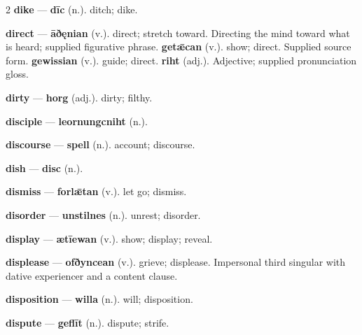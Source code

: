 \begin{multicols}{2}
\textbf{dike} — \textbf{dīc} (n.). ditch; dike.\par
\textbf{direct} — \textbf{āðęnian} (v.). direct; stretch toward. Directing the mind toward what is heard; supplied figurative phrase. \textbf{getǣcan} (v.). show; direct. Supplied source form. \textbf{gewissian} (v.). guide; direct. \textbf{riht} (adj.). Adjective; supplied pronunciation gloss.\par
\textbf{dirty} — \textbf{horg} (adj.). dirty; filthy.\par
\textbf{disciple} — \textbf{leornungcniht} (n.).\par
\textbf{discourse} — \textbf{spell} (n.). account; discourse.\par
\textbf{dish} — \textbf{disc} (n.).\par
\textbf{dismiss} — \textbf{forlǣtan} (v.). let go; dismiss.\par
\textbf{disorder} — \textbf{unstilnes} (n.). unrest; disorder.\par
\textbf{display} — \textbf{ætīewan} (v.). show; display; reveal.\par
\textbf{displease} — \textbf{ofðyncean} (v.). grieve; displease. Impersonal third singular with dative experiencer and a content clause.\par
\textbf{disposition} — \textbf{willa} (n.). will; disposition.\par
\textbf{dispute} — \textbf{geflīt} (n.). dispute; strife.\par

\end{multicols}
